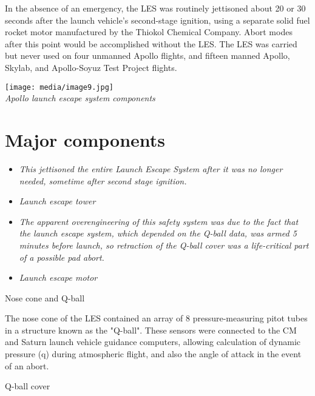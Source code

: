 In the absence of an emergency, the LES was routinely jettisoned about
20 or 30 seconds after the launch vehicle's second-stage ignition, using
a separate solid fuel rocket motor manufactured by the Thiokol Chemical
Company. Abort modes after this point would be accomplished without the
LES. The LES was carried but never used on four unmanned Apollo flights,
and fifteen manned Apollo, Skylab, and Apollo-Soyuz Test Project
flights.

\texttt{[image: media/image9.jpg]}\\
\emph{Apollo launch escape system components}

\section{Major components}\label{major-components}

\begin{itemize}
\item
  \emph{This jettisoned the entire Launch Escape System after it was no
  longer needed, sometime after second stage ignition.}
\item
  \emph{Launch escape tower}
\item
  \emph{The apparent overengineering of this safety system was due to
  the fact that the launch escape system, which depended on the Q-ball
  data, was armed 5 minutes before launch, so retraction of the Q-ball
  cover was a life-critical part of a possible pad abort.}
\item
  \emph{Launch escape motor}
\end{itemize}

Nose cone and Q-ball

The nose cone of the LES contained an array of 8 pressure-measuring
pitot tubes in a structure known as the "Q-ball". These sensors were
connected to the CM and Saturn launch vehicle guidance computers,
allowing calculation of dynamic pressure (q) during atmospheric flight,
and also the angle of attack in the event of an abort.

Q-ball cover

